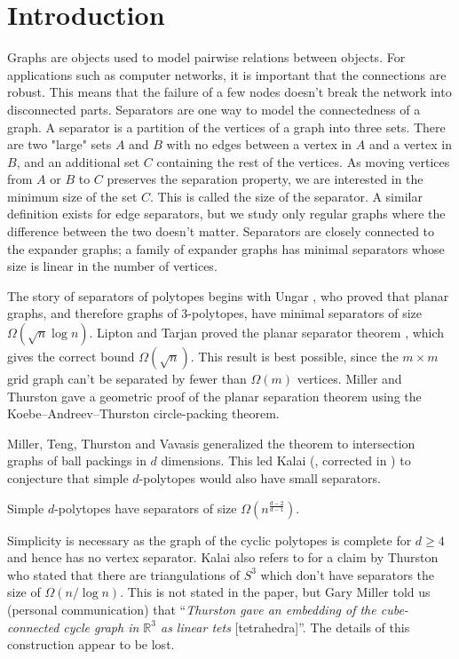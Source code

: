 \chapter{Introduction}
\label{intro}

Graphs are objects used to model pairwise relations between objects. For applications such as computer
networks, it is important that the connections are robust. This means that the failure of a few nodes doesn't 
break the network into disconnected parts. Separators are one way to model the connectedness of a graph. 
A separator is a partition of the vertices of a graph into three sets. There are two "large" sets $A$ and $B$ with no edges
between a vertex in $A$ and a vertex in $B$, and 
an additional set $C$ containing the rest of the vertices. As moving vertices from $A$ or $B$ to
$C$ preserves the separation property, we are interested in the minimum size of the set $C$. 
This is called the size of the separator. A similar definition exists for edge separators, but we study
only regular graphs where the difference between the two doesn't matter.
Separators are closely connected to the expander graphs; a family of expander graphs has minimal separators
whose size is linear in the number of vertices.



The story of separators of polytopes begins with Ungar \cite{Ungar1951},
who proved that planar graphs, and therefore graphs of 3-polytopes, have minimal 
separators of size $\Omega(\sqrt{n} \log n)$. Lipton and Tarjan proved the planar 
separator theorem  \cite{LiTa}, which gives the correct bound
$\Omega(\sqrt{n})$. This result is best possible, since the $m\times m$ grid graph
can't be separated by fewer than $\Omega(m)$ vertices. Miller and Thurston \cite{MillerThurston-separators} gave a 
geometric proof of the planar separation theorem using the  
Koebe–Andreev–Thurston circle-packing theorem.

Miller, Teng, Thurston and Vavasis \cite{MillerTengThurstonVavasis} generalized 
the theorem to intersection graphs of ball packings in $d$ dimensions. This 
led Kalai (\cite{Kal97}, corrected in \cite{kalai04:_polyt}) to conjecture that 
simple $d$-polytopes would also have small separators.
\begin{conjecture}[Kalai]
\label{simpleconjecture}
Simple $d$-polytopes have separators of size
$\Omega \left(n^{\frac{d-2}{d-1}}\right)$.
\end{conjecture}
Simplicity is necessary as the graph of the cyclic polytopes is complete for 
$d\geq 4$ and hence has no vertex separator. Kalai also refers to 
\cite{MillerTengThurstonVavasis} for a claim by Thurston who stated that there are triangulations of 
$S^3$ which don't have separators the size of $\Omega(n/\log n)$. This is not 
stated in the paper, but Gary Miller told us (personal communication) that 
“\textit{Thurston gave an embedding of the cube-connected cycle graph in $\mathbb{R}^3$
as linear tets} [tetrahedra]”. The details of this construction appear to be lost.

